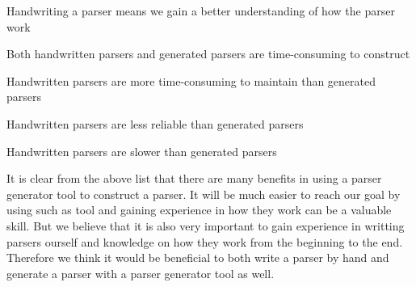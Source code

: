 \begin{dlist}
\item Handwriting a parser means we gain a better understanding of how the parser work
\item Both handwritten parsers and generated parsers are time-consuming to construct
\item Handwritten parsers are more time-consuming to maintain than generated parsers
\item Handwritten parsers are less reliable than generated parsers
\item Handwritten parsers are slower than generated parsers
\end{dlist}

It is clear from the above list that there are many benefits in using a parser generator tool to
construct a parser. It will be much easier to reach our goal by using such as tool and gaining 
experience in how they work can be a valuable skill. But we believe that it is also very important 
to gain experience in writting parsers ourself and knowledge on how they work from the beginning to the end. 
Therefore we think it would be beneficial to both write a parser by hand and generate a parser with a parser 
generator tool as well.
